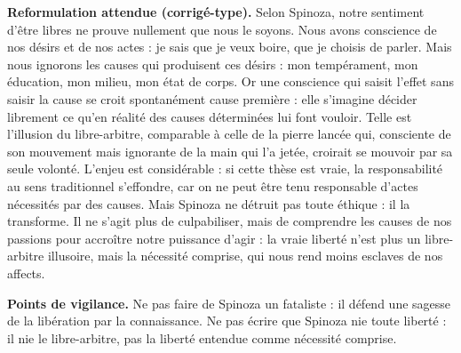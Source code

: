 \documentclass[11pt]{article}
\newcommand{\cle}[1]{{\popxbold\color{popdark}#1}}
\begin{document}
\begin{corrige}
\textbf{Reformulation attendue (corrigé-type).} Selon Spinoza, notre sentiment d'être libres ne prouve nullement que nous le soyons. Nous avons conscience de nos désirs et de nos actes : je sais que je veux boire, que je choisis de parler. Mais nous ignorons les causes qui produisent ces désirs : mon tempérament, mon éducation, mon milieu, mon état de corps. Or une conscience qui saisit l'effet sans saisir la cause se croit spontanément cause première : elle s'imagine décider librement ce qu'en réalité des causes déterminées lui font vouloir. Telle est l'illusion du libre-arbitre, comparable à celle de la pierre lancée qui, consciente de son mouvement mais ignorante de la main qui l'a jetée, croirait se mouvoir par sa seule volonté. L'enjeu est considérable : si cette thèse est vraie, la responsabilité au sens traditionnel s'effondre, car on ne peut être tenu responsable d'actes nécessités par des causes. Mais Spinoza ne détruit pas toute éthique : il la transforme. Il ne s'agit plus de culpabiliser, mais de comprendre les causes de nos passions pour accroître notre puissance d'agir : la vraie liberté n'est plus un libre-arbitre illusoire, mais la \cle{nécessité comprise}, qui nous rend moins esclaves de nos affects.

\textbf{Points de vigilance.} Ne pas faire de Spinoza un fataliste : il défend une sagesse de la libération par la connaissance. Ne pas écrire que Spinoza \guillemotleft nie toute liberté \guillemotright : il nie le libre-arbitre, pas la liberté entendue comme nécessité comprise.
\end{corrige}
\end{document}

